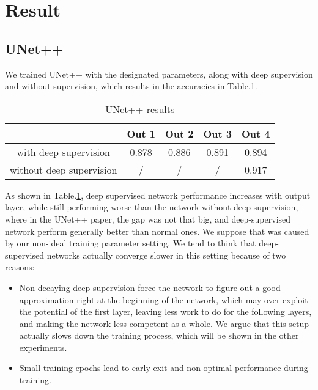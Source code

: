 \section{Result}
\subsection{UNet++}
We trained UNet++ with the designated parameters, along with deep supervision and without supervision, which results in the accuracies in Table.\ref{tab:unetppResult}.

\begin{table}[!htbp]
\centering
\caption{UNet++ results}\label{tab:unetppResult}
\begin{tabular}{c|c|c|c|c}
\hline
& Out 1&Out 2&Out 3&Out 4\\    
\hline
with deep supervision & 0.878 & 0.886 & 0.891 & 0.894\\
without deep supervision & / & / & / & 0.917\\
\hline
\end{tabular}
\end{table}

As shown in Table.\ref{tab:unetppResult}, deep supervised network performance increases with output layer, while still performing worse than the network without deep supervision, where in the UNet++ paper\cite{unet_pp}, the gap was not that big, and deep-supervised network perform generally better than normal ones. We suppose that was caused by our non-ideal training parameter setting. We tend to think that deep-supervised networks actually converge slower in this setting because of two reasons:
\begin{itemize}
    \item Non-decaying deep supervision force the network to figure out a good approximation right at the beginning of the network, which may over-exploit the potential of the first layer, leaving less work to do for the following layers, and making the network less competent as a whole. We argue that this setup actually slows down the training process, which will be shown in the other experiments.
    \item Small training epochs lead to early exit and non-optimal performance during training.
\end{itemize}

